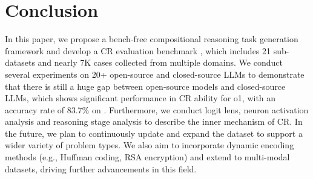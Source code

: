 \section{Conclusion}
In this paper, we propose a bench-free compositional reasoning task generation framework \ourmethod{} and develop a CR evaluation benchmark \benchmark{}, which includes 21 sub-datasets and nearly 7K cases collected from multiple domains. We conduct several experiments on 20+ open-source and closed-source LLMs to demonstrate that there is still a huge gap between open-source models and closed-source LLMs, which shows significant performance in CR ability for o1, with an accuracy rate of 83.7\% on \benchmark{}. Furthermore, we conduct logit lens, neuron activation analysis and reasoning stage analysis to describe the inner mechanism of CR. In the future, we plan to continuously update and expand the dataset to support a wider variety of problem types. We also aim to incorporate dynamic encoding methods (e.g., Huffman coding, RSA encryption) and extend \benchmark{} to multi-modal datasets, driving further advancements in this field.